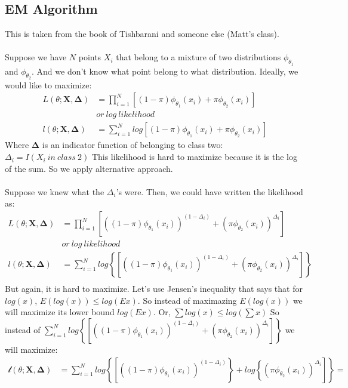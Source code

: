\documentclass[]{article}
\begin{document}
\subsection{EM Algorithm}
This is taken from the book of Tishbarani and someone else (Matt's class).\\
~\\
{
\scriptsize{Suppose we have $N$ points $X_i$ that belong to a mixture of two distributions $\phi_{\theta_1}$ and $\phi_{\theta_2}$. And we don't know what point belong to what distribution. Ideally, we would like to maximize:
$$
\begin{aligned}
	L(\theta; \pmb{X}, \pmb{\Delta}) &= \prod_{i=1}^N [(1-\pi)\phi_{\theta_1}(x_i) + \pi\phi_{\theta_2}(x_i)]\\
	 &or~log~likelihood\\
	l(\theta; \pmb{X}, \pmb{\Delta}) &= \sum_{i=1}^N log[(1-\pi)\phi_{\theta_1}(x_i) + \pi\phi_{\theta_2}(x_i)]
\end{aligned}
$$
Where $\pmb{\Delta}$ is an indicator function of belonging to class two: $\Delta_i = I(X_i ~in~class~2)$
This likelihood is hard to maximize because it is the log of the sum. So we apply alternative approach.\\
~\\
Suppose we knew what the $\Delta_i$'s were. Then, we could have written the likelihood as:
$$
\begin{aligned}
	L(\theta; \pmb{X}, \pmb{\Delta}) &= \prod_{i=1}^N \left[\left((1-\pi)\phi_{\theta_1}(x_i)\right)^{(1-\Delta_i)} + (\pi\phi_{\theta_2}(x_i))^{\Delta_i}\right]\\
	 &or~log~likelihood\\
	l(\theta; \pmb{X}, \pmb{\Delta}) &= \sum_{i=1}^N log\left\{\left[\left((1-\pi)\phi_{\theta_1}(x_i)\right)^{(1-\Delta_i)} + (\pi\phi_{\theta_2}(x_i))^{\Delta_i}\right]\right\}\\
\end{aligned}
$$
But again, it is hard to maximize. Let's use Jensen's inequality that says that for $log(x)$, $E(log(x))\leq log(Ex)$. So instead of maximazing $E(log(x))$ we will maximize its lower bound $log(Ex)$. Or, $\sum log(x) \leq log(\sum x)$ So instead of $\sum_{i=1}^N log\left\{\left[\left((1-\pi)\phi_{\theta_1}(x_i)\right)^{(1-\Delta_i)} + (\pi\phi_{\theta_2}(x_i))^{\Delta_i}\right]\right\}$ we will maximize:
$$
\begin{aligned}
	\mathcal{l}(\theta; \pmb{X}, \pmb{\Delta}) &= \sum_{i=1}^N log\left\{\left[\left((1-\pi)\phi_{\theta_1}(x_i)\right)^{(1-\Delta_i)}\right\} + log \left\{(\pi\phi_{\theta_2}(x_i))^{\Delta_i}\right]\right\}=\\

\end{aligned}$$}}
\end{document}
